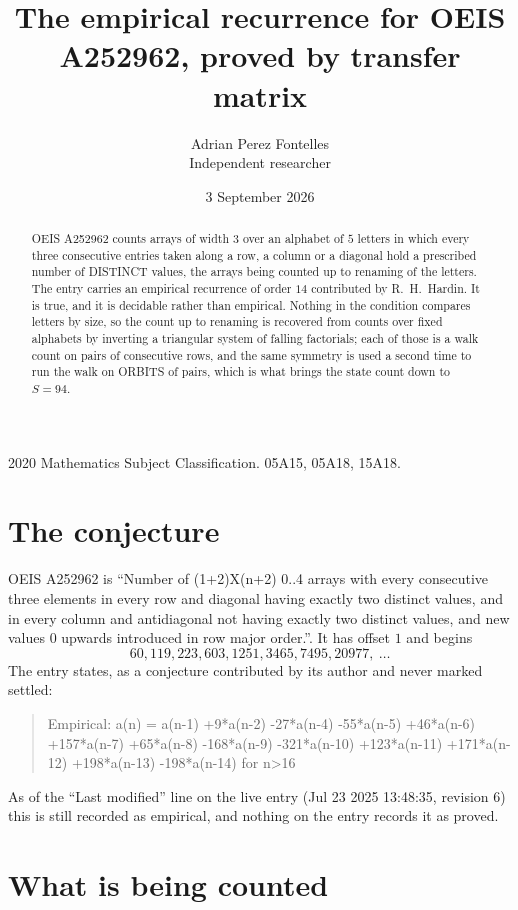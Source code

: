 \documentclass[11pt,a4paper]{article}
\title{The empirical recurrence for OEIS A252962, proved by transfer matrix}
\author{Adrian Perez Fontelles\\ \small Independent researcher}
\date{3 September 2026}
\theoremstyle{plain}
\theoremstyle{definition}
\begin{document}
\maketitle

\begin{abstract}
OEIS A252962 counts arrays of width $3$ over an alphabet of $5$ letters in which every three
consecutive entries taken along a row, a column or a diagonal hold a prescribed number of
DISTINCT values, the arrays being counted up to renaming of the letters. The entry carries an
empirical recurrence of order $14$ contributed by R.~H.~Hardin. It is true, and it is
decidable rather than empirical. Nothing in the condition compares letters by size, so the
count up to renaming is recovered from counts over fixed alphabets by inverting a triangular
system of falling factorials; each of those is a walk count on pairs of consecutive rows, and
the same symmetry is used a second time to run the walk on ORBITS of pairs, which is what
brings the state count down to $S=94$.
\end{abstract}

\noindent\small 2020 Mathematics Subject Classification. 05A15, 05A18, 15A18.\normalsize

\section{The conjecture}

OEIS A252962 is ``Number of (1+2)X(n+2) 0..4 arrays with every consecutive three elements in every row and diagonal having exactly two distinct values, and in every column and antidiagonal not having exactly two distinct values, and new values 0 upwards introduced in row major order.''. It has offset $1$ and begins
\[
60, 119, 223, 603, 1251, 3465, 7495, 20977,\ \dots
\]
The entry states, as a conjecture contributed by its author and never marked settled:
\begin{quote}
Empirical: a(n) = a(n-1) +9*a(n-2) -27*a(n-4) -55*a(n-5) +46*a(n-6) +157*a(n-7) +65*a(n-8) -168*a(n-9) -321*a(n-10) +123*a(n-11) +171*a(n-12) +198*a(n-13) -198*a(n-14) for n>16
\end{quote}
As of the ``Last modified'' line on the live entry (Jul 23 2025 13:48:35, revision 6) this is still
recorded as empirical, and nothing on the entry records it as proved.

\section{What is being counted}
\end{document}
